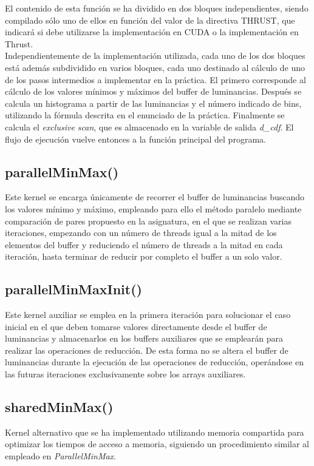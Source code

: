 \documentclass[10pt,oneside,a4paper]{article}
\begin{document}
El contenido de esta función se ha dividido en dos bloques independientes, siendo compilado sólo uno de ellos en función del valor de la directiva THRUST, que indicará si debe utilizarse la implementación en CUDA o la implementación en Thrust.\\

Independientemente de la implementación utilizada, cada uno de los dos bloques está además subdividido en varios bloques, cada uno destinado al cálculo de uno de los pasos intermedios a implementar en la práctica. El primero corresponde al cálculo de los valores mínimos y máximos del buffer de luminancias. Después se calcula un histograma a partir de las luminancias y el número indicado de bins, utilizando la fórmula descrita en el enunciado de la práctica. Finalmente se calcula el \textit{exclusive scan}, que es almacenado en la variable de salida \textit{d\_cdf}. El flujo de ejecución vuelve entonces a la función principal del programa.

\subsection{parallelMinMax()}
Este kernel se encarga únicamente de recorrer el buffer de luminancias buscando los valores mínimo y máximo, empleando para ello el método paralelo mediante comparación de pares propuesto en la asignatura, en el que se realizan varias iteraciones, empezando con un número de threads igual a la mitad de los elementos del buffer y reduciendo el número de threads a la mitad en cada iteración, hasta terminar de reducir por completo el buffer a un solo valor.

\subsection{parallelMinMaxInit()}
Este kernel auxiliar se emplea en la primera iteración para solucionar el caso inicial en el que deben tomarse valores directamente desde el buffer de luminancias y almacenarlos en los buffers auxiliares que se emplearán para realizar las operaciones de reducción. De esta forma no se altera el buffer de luminancias durante la ejecución de las operaciones de reducción, operándose en las futuras iteraciones exclusivamente sobre los arrays auxiliares.

\subsection{sharedMinMax()}
Kernel alternativo que se ha implementado utilizando memoria compartida para optimizar los tiempos de acceso a memoria, siguiendo un procedimiento similar al empleado en \textit{ParallelMinMax}.
\end{document}
